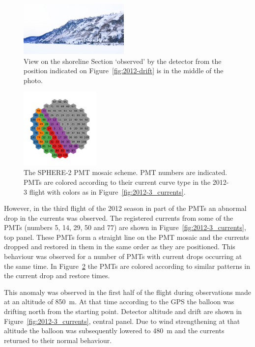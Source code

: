 \documentclass[universe,article,submit,moreauthors,pdftex]{Definitions/mdpi}
\begin{document}
\begin{figure}[tb]
    \includegraphics[width=0.48\textwidth]{DSC_7256_1.jpg}
    \caption{View on the shoreline Section `observed' by the detector from the position indicated on Figure~\ref{fig:2012-drift} is in the middle of the photo.}
    \label{fig:2012--shore-view}
\end{figure}
\begin{figure}[tb]
\centering
    \includegraphics[width=0.35\textwidth]{2012-3_retina_all.pdf}
    \caption{The SPHERE-2 PMT mosaic scheme. PMT numbers are indicated. PMTs are colored according to their current curve type in the 2012-3 flight with colors as in Figure~\ref{fig:2012-3_currents}.}
    \label{fig:2012-3_shore_image}
\end{figure}

However, in the third flight of the 2012 season in part of the PMTs an abnormal drop in the currents was observed.
The registered currents from some of the PMTs (numbers 5, 14, 29, 50 and 77) are shown in Figure~\ref{fig:2012-3_currents}, top panel. These PMTs form a straight line on the PMT mosaic and the currents dropped and restored in them in the same order as they are positioned. This behaviour was observed for a number of PMTs with current drops occurring at the same time. In Figure~\ref{fig:2012-3_shore_image} the PMTs are colored according to similar patterns in the current drop and restore times.

This anomaly was observed in the first half of the flight during observations made at an altitude of 850~m. At that time according to the GPS the balloon was drifting north from the starting point. Detector altitude and drift are shown in Figure~\ref{fig:2012-3_currents}, central panel. Due to wind strengthening at that altitude the balloon was subsequently lowered to 480~m and the currents returned to their normal behaviour. 
\end{document}
